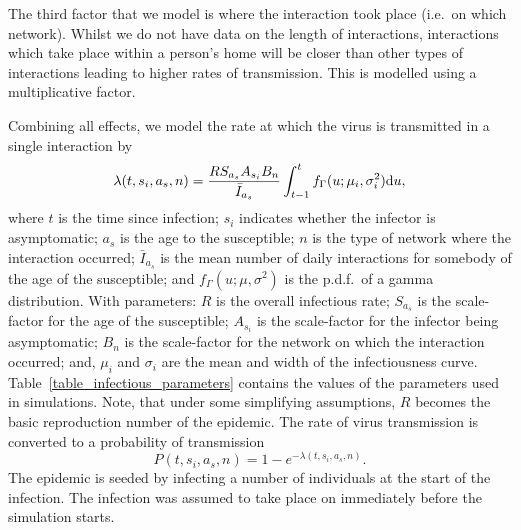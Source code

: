 \documentclass[12pt, oneside]{amsart}   	%
\begin{document}
The third factor that we model is where the interaction took place (i.e.\ on which network).
Whilst we do not have data on the length of interactions, interactions which take place within a person's home will be closer than other types of interactions leading to higher rates of transmission.
This is modelled using a multiplicative factor.

Combining all effects, we model the rate at which the virus is transmitted in a single interaction by
\begin{equation}
\lambda(t,s_i,a_s,n) = \frac{R S_{a_s}A_{s_i} B_n}{ \bar I_{a_s}} \int_{t-1}^t f_{\Gamma}(u; \mu_i,\sigma_i^2) {\rm d}u,
\end{equation}
where $t$ is the time since infection; $s_i$ indicates whether the infector is asymptomatic; $a_s$ is the age to the susceptible; $n$ is the type of network where the interaction occurred; $\bar{I}_{a_s}$ is the mean number of daily interactions for somebody of the age of the susceptible; and $f_{\Gamma}(u; \mu,\sigma^2)$ is the p.d.f.\ of a gamma distribution.
With parameters: $R$ is the overall infectious rate; $S_{a_s}$ is the scale-factor for the age of the susceptible; $A_{s_i}$ is the scale-factor for the infector being asymptomatic; $B_n$ is the scale-factor for the network on which the interaction occurred; and, $\mu_i$ and $\sigma_i$ are the mean and width of the infectiousness curve.
Table~\ref{table_infectious_parameters} contains the values of the parameters used in simulations.
Note, that under some simplifying assumptions, $R$ becomes the basic reproduction number of the epidemic.
The rate of virus transmission is converted to a probability of transmission
\begin{equation}
P(t,s_i,a_s,n) = 1 - e^{-\lambda(t,s_i,a_s,n)}.
\end{equation}
The epidemic is seeded by infecting a number of individuals at the start of the infection.
The infection was assumed to take place on immediately before the simulation starts.
\end{document}
